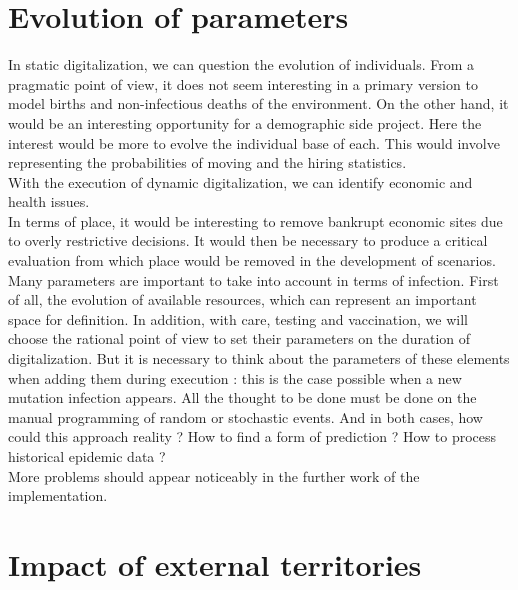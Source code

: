 \newpage

\section{Evolution of parameters}

In static digitalization, we can question the evolution of individuals. From a pragmatic point of view, it does not seem interesting in a primary version to model births and non-infectious deaths of the environment. On the other hand, it would be an interesting opportunity for a demographic side project. Here the interest would be more to evolve the individual base of each. This would involve representing the probabilities of moving and the hiring statistics.\\

With the execution of dynamic digitalization, we can identify economic and health issues.\\

In terms of place, it would be interesting to remove bankrupt economic sites due to overly restrictive decisions. It would then be necessary to produce a critical evaluation from which place would be removed in the development of scenarios.\\

Many parameters are important to take into account in terms of infection. First of all, the evolution of available resources, which can represent an important space for definition. In addition, with care, testing and vaccination, we will choose the rational point of view to set their parameters on the duration of digitalization. But it is necessary to think about the parameters of these elements when adding them during execution : this is the case possible when a new mutation infection appears. All the thought to be done must be done on the manual programming of random or stochastic events. And in both cases, how could this approach reality ? How to find a form of prediction ? How to process historical epidemic data ?\\

More problems should appear noticeably in the further work of the implementation.\\

\newpage

\section{Impact of external territories}

